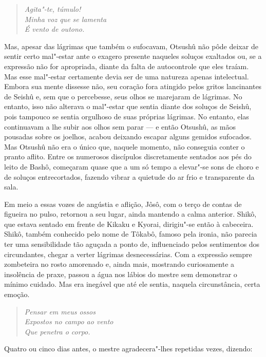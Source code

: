 \begin{verse}
\textit{Agita"-te, túmulo!\\
Minha voz que se lamenta\\
É vento de outono.}
\end{verse}

Mas, apesar das lágrimas que também o sufocavam, Otsushû não pôde deixar
de sentir certo mal"-estar ante o exagero presente naqueles soluços
exaltados ou, se a expressão não for apropriada, diante da falta de
autocontrole que eles traíam. Mas esse mal"-estar certamente devia ser
de uma natureza apenas intelectual. Embora sua mente dissesse não, seu
coração fora atingido pelos gritos lancinantes de Seishû e, sem que o
percebesse, seus olhos se marejaram de lágrimas. No entanto, isso não
alterava o mal"-estar que sentia diante dos soluços de Seishû, pois
tampouco se sentia orgulhoso de suas próprias lágrimas. No entanto,
elas continuavam a lhe subir aos olhos sem parar --- e então Otsushû, as
mãos pousadas sobre os joelhos, acabou deixando escapar alguns gemidos
sufocados. Mas Otsushû não era o único que, naquele momento, não
conseguia conter o pranto aflito. Entre os numerosos discípulos
discretamente sentados aos pés do leito de Bashô, começaram quase que a
um só tempo a elevar"-se sons de choro e de soluços entrecortados,
fazendo vibrar a quietude do ar frio e transparente da sala.

Em meio a essas vozes de angústia e aflição, Jôsô, com o terço de contas
de figueira no pulso, retornou a seu lugar, ainda mantendo a calma
anterior. Shikô, que estava sentado em frente de Kikaku e Kyorai,
dirigiu"-se então à cabeceira. Shikô, também conhecido pelo nome de
Tôkabô, famoso pela ironia, não parecia ter uma sensibilidade tão
aguçada a ponto de, influenciado pelos sentimentos dos circundantes,
chegar a verter lágrimas desnecessárias. Com a expressão sempre zombeteira 
no rosto amorenado e, ainda mais, mostrando
curiosamente a insolência de praxe, passou a água nos lábios do mestre
sem demonstrar o mínimo cuidado. Mas era inegável que até ele sentia,
naquela circunstância, certa emoção.
 
\begin{verse}
\textit{Pensar em meus ossos\\
Expostos no campo ao vento\\
Que penetra o corpo.}
\end{verse}

Quatro ou cinco dias antes, o mestre agradecera"-lhes repetidas vezes, dizendo:

